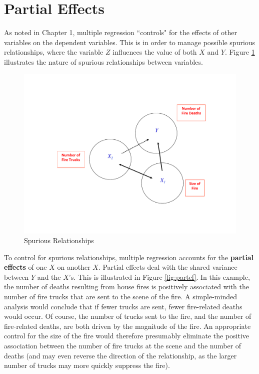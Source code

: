 \documentclass[11pt,openany]{book}\usepackage[]{graphicx}\usepackage[]{color}
\begin{document}
{\section{Partial Effects}

As noted in Chapter 1, multiple regression ``controls" for the effects of other variables on the dependent variables. This is in order to manage possible spurious relationships, where the variable $Z$ influences the value of both $X$ and $Y$. Figure \ref{fig:spur} illustrates the nature of
spurious relationships between variables.   
\begin{figure}
  \centering
  \includegraphics[width=5in]{12_LogicMult/spur.pdf}
  \caption{Spurious Relationships \label{fig:spur}}
\end{figure}

To control for spurious relationships, multiple regression accounts for the \textbf{partial effects} of one $X$ on another $X$. Partial effects deal with the shared variance between $Y$ and the $X$'s. This is illustrated in Figure \ref{fig:partef}.  In this example, the number of deaths resulting from house fires is positively associated with the number of fire trucks that are sent to the scene of the fire. A simple-minded analysis would conclude that if fewer trucks are sent, fewer fire-related deaths would occur. Of course, the number of trucks sent to the fire, and the number of 
fire-related deaths, are both driven by the magnitude of the fire. An appropriate control for the size of the fire would therefore presumably eliminate the positive association between the number of fire trucks at the scene and the number of deaths (and may even  reverse the direction of the relationship, as the larger number of trucks may more quickly suppress the fire).

}
\end{document}
